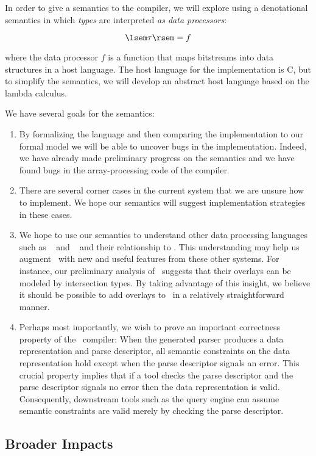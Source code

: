 \documentclass[11pt]{article}
\begin{document}
In order to give a semantics to the \pads{} compiler, we will explore using
a denotational semantics in which {\em types} are interpreted 
{\em as data processors}:

\[
\lsem \tau \rsem = f
\]

\noindent
where the data processor $f$ is a function that maps bitstreams into 
data structures in a host language.  The host language for the
implementation is C, but to simplify the semantics, we will 
develop an abstract host language based on the lambda calculus.

We have several goals for the semantics:  

\begin{enumerate}
\item By formalizing the language and then comparing the implementation to our
formal model we will be able to uncover bugs in the implementation.
Indeed, we have already made preliminary progress on the semantics and we have
found bugs in the array-processing code of the compiler.  
\item There are several corner cases in the current system 
that we are unsure how to implement.  We hope our semantics
will suggest implementation strategies in these cases.
\item We hope to use our semantics to understand other data
processing languages such as
\packettypes{}~\cite{sigcomm00} and
\datascript{}~\cite{gpce02} and their relationship to
\pads{}.  This understanding may help us augment \pads{}\ with new
and useful features from these other systems.  For instance,
our preliminary analysis of \packettypes{}\ suggests that their
overlays can be modeled by intersection types.  By taking advantage of this 
insight, we believe it should be possible to add overlays to \pads{}\ 
in a relatively straightforward manner.
\item Perhaps most importantly, we wish to prove an important
correctness property of the \pads{}\ compiler:  When the generated parser
produces a data representation and parse descriptor, all semantic 
constraints on the data representation hold except when the parse 
descriptor signals an error.  This crucial property implies that
if a tool checks the parse descriptor and the parse descriptor
signals no error then the data representation is valid.  Consequently,
downstream tools such as the query engine can assume semantic constraints
are valid merely by checking the parse descriptor.
\end{enumerate}

\subsection{Broader Impacts}
\label{ssec:impact}
\end{document}
